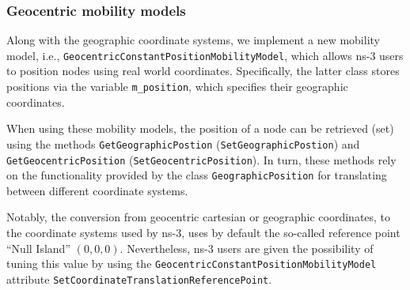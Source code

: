 
\subsubsection{Geocentric mobility models}
\label{sub:mobility}
Along with the geographic coordinate systems, we implement a new mobility model, i.e., \texttt{Geocentric\-Constant\-Position\-Mobility\-Model}, which allows ns-3 users to position nodes using real world coordinates.
Specifically, the latter class stores positions via the variable \verb|m_position|, which specifies their geographic coordinates.

When using these mobility models, the position of a node can be retrieved (set) using the methods \texttt{Get\-Geographic\-Postion} (\texttt{Set\-Geographic\-Postion}) and \texttt{Get\-Geocentric\-Position} (\texttt{Set\-Geocentric\-Position}). In turn, these methods rely on the functionality provided by the class \texttt{Geographic\-Position} for translating between different coordinate systems. 

Notably, the conversion from geocentric cartesian or geographic coordinates, to the coordinate systems used by ns-3, uses by default the so-called reference point ``{Null Island}'' $(0,0,0)$. Nevertheless, ns-3 users are given the possibility of tuning this value by using the \texttt{Geocentric\-Constant\-Position\-Mobility\-Model} attribute \texttt{Set\-Coordinate\-Translation\-Reference\-Point}.




